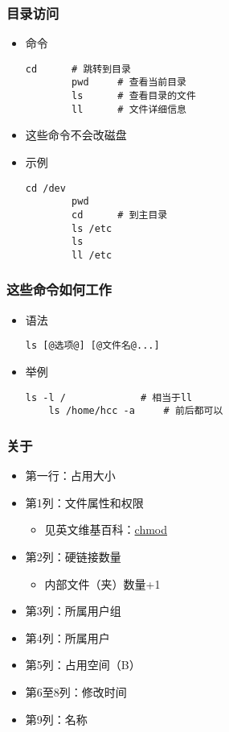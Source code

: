 \begin{CJK}{UTF8}{gbsn}
\begin{frame} [fragile]
	\frametitle{目录访问}
	\linespread{1.25}
	\begin{itemize}
	\item 命令
		\begin{lstlisting}[style=bashstyle, gobble=8, texcl]
		cd		# 跳转到目录
		pwd		# 查看当前目录
		ls		# 查看目录的文件
		ll		# 文件详细信息
		\end{lstlisting}
	\item 这些命令不会改磁盘
	\item 示例
		\begin{lstlisting}[style=bashstyle, gobble=8, texcl]
		cd /dev
		pwd
		cd		# 到主目录
		ls /etc
		ls
		ll /etc
	\end{lstlisting}
	\end{itemize}
\end{frame}

\begin{frame} [fragile]
	\frametitle{这些命令如何工作}
	\linespread{1.25}
	\begin{itemize}
	\item 语法
	\begin{lstlisting}[style=bashstyle, gobble=4, escapechar=@]
	ls [@选项@] [@文件名@...]
	\end{lstlisting}
	\item 举例
	\begin{lstlisting}[style=bashstyle, gobble=4, texcl]
	ls -l /				# 相当于ll
	ls /home/hcc -a		# 前后都可以
	\end{lstlisting}
	\end{itemize}
\end{frame}

\begin{frame} [fragile]
	\frametitle{关于}
	\linespread{1.25}
	\begin{itemize}
	\item 第一行：占用大小
	\item 第1列：文件属性和权限
		\begin{itemize}
		\item 见英文维基百科：\href{https://en.wikipedia.org/wiki/Chmod}{chmod}
		\end{itemize}
	\item 第2列：硬链接数量
		\begin{itemize}
		\item 内部文件（夹）数量+1
		\end{itemize}
	\item 第3列：所属用户组
	\item 第4列：所属用户
	\item 第5列：占用空间（B）
	\item 第6至8列：修改时间
	\item 第9列：名称
	\end{itemize}
\end{frame}


\end{CJK}
